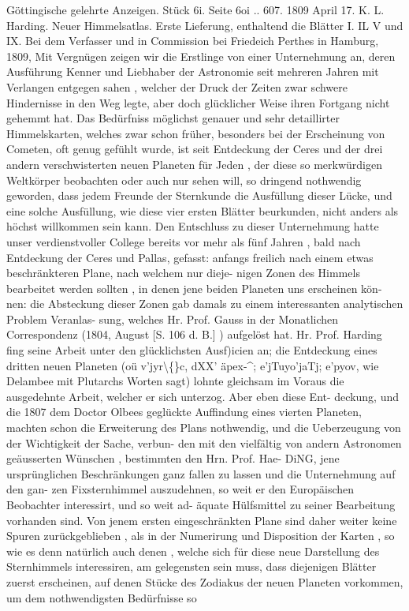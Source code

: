 \documentclass[12pt,a4paper]{article}
\begin{document}
Göttingische  gelehrte  Anzeigen.     Stück  6i.     Seite  6oi ..  607.     1809  April  17. K.  L.  Harding.  Neuer  Himmelsatlas.  Erste  Lieferung,  enthaltend  die  Blätter  I.  IL  V  und  IX. Bei  dem  Verfasser  und  in  Commission  bei  Friedeich  Perthes  in  Hamburg,  1809, Mit  Vergnügen  zeigen  wir  die  Erstlinge  von  einer  Unternehmung  an,  deren  Ausführung  Kenner und  Liebhaber  der  Astronomie  seit  mehreren  Jahren  mit  Verlangen  entgegen  sahen ,  welcher  der  Druck der  Zeiten  zwar  schwere  Hindernisse  in  den  Weg  legte,  aber  doch  glücklicher  Weise  ihren  Fortgang nicht  gehemmt  hat.  Das  Bedürfniss  möglichst  genauer  und  sehr  detaillirter  Himmelskarten,  welches  zwar schon  früher,  besonders  bei  der  Erscheinung  von  Cometen,  oft  genug  gefühlt  wurde,  ist  seit  Entdeckung der  Ceres  und  der  drei  andern  verschwisterten  neuen  Planeten  für  Jeden ,  der  diese  so  merkwürdigen Weltkörper  beobachten  oder  auch  nur  sehen  will,  so  dringend  nothwendig  geworden,  dass  jedem  Freunde der  Sternkunde  die  Ausfüllung  dieser  Lücke,  und  eine  solche  Ausfüllung,  wie  diese  vier  ersten  Blätter beurkunden,  nicht  anders  als  höchst  willkommen  sein  kann.  Den  Entschluss  zu  dieser  Unternehmung hatte  unser  verdienstvoller  College  bereits  vor  mehr  als  fünf  Jahren ,  bald  nach  Entdeckung  der  Ceres und  Pallas,  gefasst:  anfangs  freilich  nach  einem  etwas  beschränkteren  Plane,  nach  welchem  nur  dieje- nigen Zonen  des  Himmels  bearbeitet  werden  sollten ,  in  denen  jene  beiden  Planeten  uns  erscheinen  kön- nen: die  Absteckung  dieser  Zonen  gab  damals  zu  einem  interessanten  analytischen  Problem  Veranlas- sung, welches  Hr.  Prof.  Gauss  in  der  Monatlichen  Correspondenz  (1804,  August  [S.  106  d.  B.] )  aufgelöst hat.  Hr.  Prof.  Harding  fing  seine  Arbeit  unter  den  glücklichsten  Ausf)icien  an;  die  Entdeckung  eines dritten  neuen  Planeten  (oü  v'jyr\textbackslash\{\}c,  dXX'  äpex-\textasciicircum{};  e'jTuyo'jaTj;  e'pyov,  wie  Delambee  mit  Plutarchs  Worten  sagt) lohnte  gleichsam  im  Voraus  die  ausgedehnte  Arbeit,  welcher  er  sich  unterzog.  Aber  eben  diese  Ent- deckung, und  die  1807  dem  Doctor  Olbees  geglückte  Auffindung  eines  vierten  Planeten,  machten  schon die  Erweiterung  des  Plans  nothwendig,  und  die  Ueberzeugung  von  der  Wichtigkeit  der  Sache,  verbun- den mit  den  vielfältig  von  andern  Astronomen  geäusserten  Wünschen ,  bestimmten  den  Hrn.  Prof.  Hae- DiNG,  jene  ursprünglichen  Beschränkungen  ganz  fallen  zu  lassen  und  die  Unternehmung  auf  den  gan- zen Fixsternhimmel  auszudehnen,  so  weit  er  den  Europäischen  Beobachter  interessirt,  und  so  weit  ad- äquate Hülfsmittel  zu  seiner  Bearbeitung  vorhanden  sind.  Von  jenem  ersten  eingeschränkten  Plane  sind daher  weiter  keine  Spuren  zurückgeblieben ,  als  in  der  Numerirung  und  Disposition  der  Karten ,  so  wie es  denn  natürlich  auch  denen ,  welche  sich  für  diese  neue  Darstellung  des  Sternhimmels  interessiren,  am gelegensten  sein  muss,  dass  diejenigen  Blätter  zuerst  erscheinen,  auf  denen  Stücke  des  Zodiakus  der neuen  Planeten  vorkommen,  um  dem  nothwendigsten  Bedürfnisse  so  
\end{document}

